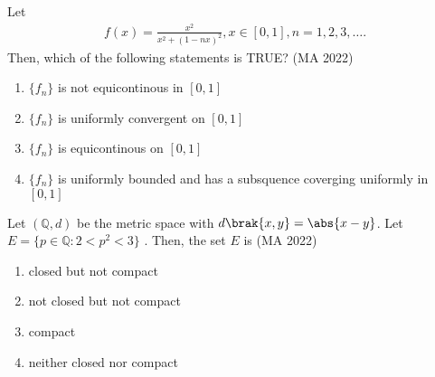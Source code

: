 \iffalse
\title{MA-2020-40-52}
\author{EE24BTECH11041-Mohit}
\section{xe}
\chapter{2020}
\fi


\item Let \\
\begin{align}
f(x)=\frac{x^2}{x^2+(1-nx)^2}, x \in [0,1], n = 1,2,3,\dots  .
\end{align}
Then, which of the following statements is TRUE?
\hfill{(MA 2022)}
\begin{enumerate}
\item $\{f_n\}$ is not equicontinous in $[0,1]$
\item $\{f_n\}$ is uniformly convergent on $[0,1]$
\item $\{f_n\}$ is equicontinous on $[0,1]$
\item $\{f_n\}$ is uniformly bounded and has a subsquence coverging uniformly in $[0,1]$
\end{enumerate}
\item Let $(\mathbb{Q},d)$ be the metric space with $d\brak{x,y} = \abs{x-y}$. Let $E = \{p \in \mathbb{Q} : 2 < p^2 < 3 \}$ . Then, the set $E$ is 
\hfill{(MA 2022)}
\begin{enumerate}
\item closed but not compact
\item not closed but not compact
\item compact
\item neither closed nor compact
\end{enumerate}

